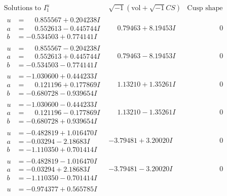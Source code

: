 \documentclass[1p]{elsarticle_modified}
\theoremstyle{definition}
\newcommand{\I}{\sqrt{-1}}
\begin{document}
$$\begin{array}{c|c|c}
\text{Solutions to }I^u_{1}& \I (\text{vol} + \sqrt{-1}CS) & \text{Cusp shape}\\
 \hline 
\begin{aligned}
u &= \phantom{-}0.855567 + 0.204238 I \\
a &= \phantom{-}0.552613 - 0.445744 I \\
b &= -0.534503 + 0.774141 I\end{aligned}
 & \phantom{-}0.79463 + 8.19453 I & \phantom{-0.000000 } 0 \\ \hline\begin{aligned}
u &= \phantom{-}0.855567 - 0.204238 I \\
a &= \phantom{-}0.552613 + 0.445744 I \\
b &= -0.534503 - 0.774141 I\end{aligned}
 & \phantom{-}0.79463 - 8.19453 I & \phantom{-0.000000 } 0 \\ \hline\begin{aligned}
u &= -1.030600 + 0.444233 I \\
a &= \phantom{-}0.121196 + 0.177869 I \\
b &= -0.680728 - 0.939654 I\end{aligned}
 & \phantom{-}1.13210 + 1.35261 I & \phantom{-0.000000 } 0 \\ \hline\begin{aligned}
u &= -1.030600 - 0.444233 I \\
a &= \phantom{-}0.121196 - 0.177869 I \\
b &= -0.680728 + 0.939654 I\end{aligned}
 & \phantom{-}1.13210 - 1.35261 I & \phantom{-0.000000 } 0 \\ \hline\begin{aligned}
u &= -0.482819 + 1.016470 I \\
a &= -0.03294 - 2.18683 I \\
b &= -1.110350 + 0.701414 I\end{aligned}
 & -3.79481 + 3.20020 I & \phantom{-0.000000 } 0 \\ \hline\begin{aligned}
u &= -0.482819 - 1.016470 I \\
a &= -0.03294 + 2.18683 I \\
b &= -1.110350 - 0.701414 I\end{aligned}
 & -3.79481 - 3.20020 I & \phantom{-0.000000 } 0 \\ \hline\begin{aligned}
u &= -0.974377 + 0.565785 I \\

\end{aligned}
\end{array}$$
\end{document}

